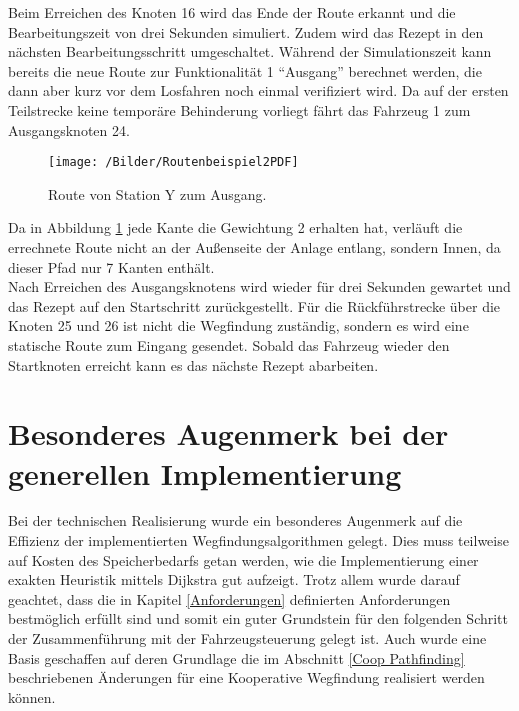 		Beim Erreichen des Knoten 16 wird das Ende der Route erkannt und die Bearbeitungszeit von drei Sekunden simuliert. Zudem wird das Rezept in den nächsten Bearbeitungsschritt umgeschaltet. Während der Simulationszeit kann bereits die neue Route zur Funktionalität 1 "`Ausgang"' berechnet werden, die dann aber kurz vor dem Losfahren noch einmal verifiziert wird. Da auf der ersten Teilstrecke keine temporäre Behinderung vorliegt fährt das Fahrzeug 1 zum Ausgangsknoten 24.
		
		\begin{figure}[H]
			\centering
			\texttt{[image: /Bilder/Routenbeispiel2PDF]}
			\vspace{0.2cm}
			\caption{Route von Station Y zum Ausgang.}\label{Routenbeispiel2}
		\end{figure}
		
		Da in Abbildung \ref{Routenbeispiel2} jede Kante die Gewichtung 2 erhalten hat, verläuft die errechnete Route nicht an der Außenseite der Anlage entlang, sondern Innen, da dieser Pfad nur 7 Kanten enthält.
		\\[4pt]
		Nach Erreichen des Ausgangsknotens wird wieder für drei Sekunden gewartet und das Rezept auf den Startschritt zurückgestellt. Für die Rückführstrecke über die Knoten 25 und 26 ist nicht die Wegfindung zuständig, sondern es wird eine statische Route zum Eingang gesendet. Sobald das Fahrzeug wieder den Startknoten erreicht kann es das nächste Rezept abarbeiten.
		
		
	\section{Besonderes Augenmerk bei der generellen Implementierung}
		Bei der technischen Realisierung wurde ein besonderes Augenmerk auf die Effizienz der implementierten Wegfindungsalgorithmen gelegt. Dies muss teilweise auf Kosten des Speicherbedarfs getan werden, wie die Implementierung einer exakten Heuristik mittels Dijkstra gut aufzeigt. Trotz allem wurde darauf geachtet, dass die in Kapitel \ref{Anforderungen} definierten Anforderungen bestmöglich erfüllt sind und somit ein guter Grundstein für den folgenden Schritt der Zusammenführung mit der Fahrzeugsteuerung gelegt ist. Auch wurde eine Basis geschaffen auf deren Grundlage die im Abschnitt \ref{Coop Pathfinding} beschriebenen Änderungen für eine Kooperative Wegfindung realisiert werden können.